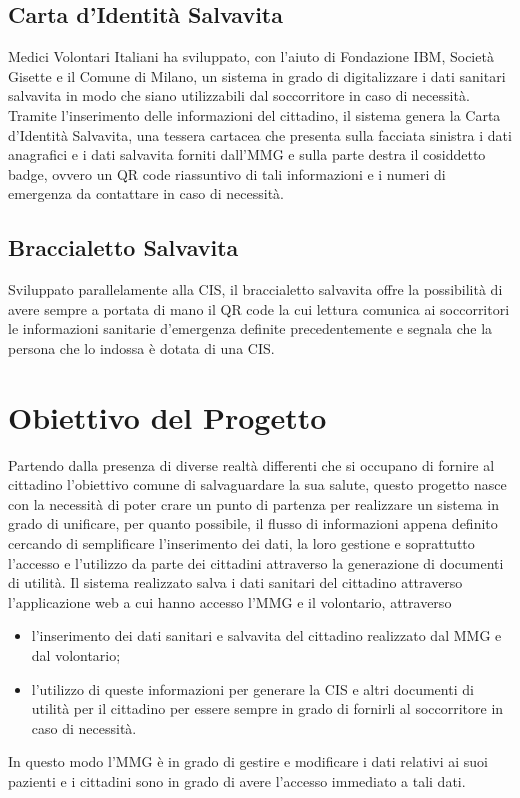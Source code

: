 \documentclass[12pt,a4paper,twoside,openright,titlepage]{book}
\begin{document}
\subsection{Carta d'Identità Salvavita}
Medici Volontari Italiani ha sviluppato, con l'aiuto di Fondazione IBM, Società Gisette e il Comune di Milano, un sistema in grado di digitalizzare i dati sanitari salvavita in modo che siano utilizzabili dal soccorritore in caso di necessità. Tramite l'inserimento delle informazioni del cittadino, il sistema genera la Carta d'Identità Salvavita, una tessera cartacea che presenta sulla facciata sinistra i dati anagrafici e i dati salvavita forniti dall'MMG e sulla parte destra il cosiddetto badge, ovvero un QR code riassuntivo di tali informazioni e i numeri di emergenza da contattare in caso di necessità.

\subsection{Braccialetto Salvavita}
Sviluppato parallelamente alla CIS, il braccialetto salvavita offre la possibilità di avere sempre a portata di mano il QR code la cui lettura comunica ai soccorritori le informazioni sanitarie d'emergenza definite precedentemente e segnala che la persona che lo indossa è dotata di una CIS.

\section{Obiettivo del Progetto}
Partendo dalla presenza di diverse realtà differenti che si occupano di fornire al cittadino l'obiettivo comune di salvaguardare la sua salute, questo progetto nasce con la necessità di poter crare un punto di partenza per realizzare un sistema in grado di unificare, per quanto possibile, il flusso di informazioni appena definito cercando di semplificare l'inserimento dei dati, la loro gestione e  soprattutto l'accesso e l'utilizzo da parte dei cittadini attraverso la generazione di documenti di utilità.
Il sistema realizzato salva i dati sanitari del cittadino attraverso l'applicazione web a cui hanno accesso l'MMG e il volontario, attraverso


\begin{itemize}
\item l'inserimento dei dati sanitari e salvavita del cittadino realizzato dal MMG e dal volontario;
\item l'utilizzo di queste informazioni per generare la CIS e altri documenti di utilità per il cittadino per essere sempre in grado di fornirli al soccorritore in caso di necessità.
\end{itemize}
In questo modo l'MMG è in grado di gestire e modificare i dati relativi ai suoi pazienti e i cittadini sono in grado di avere l'accesso immediato a tali dati.
\end{document}
